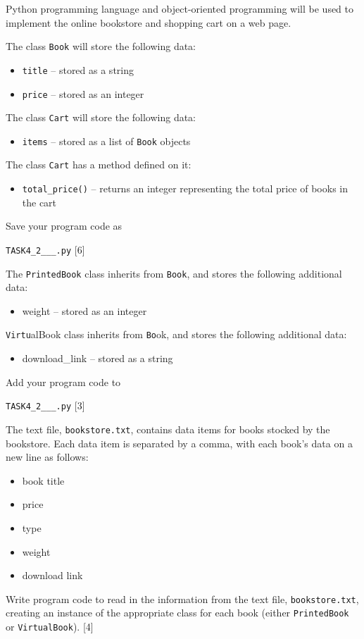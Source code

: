 Python programming language and object-oriented programming will be
used to implement the online bookstore and shopping cart on a web
page. 

The class \texttt{Book} will store the following data: 
\begin{itemize}
\item \texttt{title} -- stored as a string 
\item \texttt{price} -- stored as an integer 
\end{itemize}
The class \texttt{Cart} will store the following data: 
\begin{itemize}
\item \texttt{items} -- stored as a list of \texttt{Book} objects 
\end{itemize}
The class \texttt{Cart} has a method defined on it: 
\begin{itemize}
\item \texttt{total\_price()} -- returns an integer representing the total
price of books in the cart 
\end{itemize}
Save your program code as 

\texttt{TASK4\_2\_<your name>\_<centre number>\_<index number>.py}
\hfill{}{[}6{]}

The \texttt{PrintedBook} class inherits from \texttt{Book}, and stores
the following additional data: 
\begin{itemize}
\item weight -- stored as an integer 
\end{itemize}
\texttt{Virtu}alBook class inherits from \texttt{Bo}ok, and stores
the following additional data: 
\begin{itemize}
\item download\_link -- stored as a string 
\end{itemize}
Add your program code to 

\texttt{TASK4\_2\_<your name>\_<centre number>\_<index number>.py}
{[}3{]} 

The text file, \texttt{bookstore.txt}, contains data items for books
stocked by the bookstore. Each data item is separated by a comma,
with each book\textquoteright s data on a new line as follows: 
\begin{itemize}
\item book title 
\item price 
\item type 
\item weight 
\item download link 
\end{itemize}
Write program code to read in the information from the text file,
\texttt{bookstore.txt}, creating an instance of the appropriate class
for each book (either \texttt{PrintedBook} or \texttt{VirtualBook}).
\hfill{}{[}4{]}

